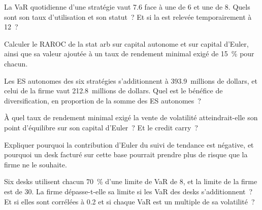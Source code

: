 \begin{exercise}[$\star$]\label{exo:fm:limits-and-capital-allocation:1}
La VaR quotidienne d'une stratégie vaut 7.6 face à une  de 6 et une  de 8. Quels sont son taux d'utilisation et son statut~? Et si la
 est relevée temporairement à 12~?
\end{exercise}

\begin{exercise}[$\star$]\label{exo:fm:limits-and-capital-allocation:2}
Calculer le RAROC de la stat arb sur capital autonome et sur capital d'Euler, ainsi que sa valeur ajoutée à un taux de rendement minimal exigé de 15~\% pour chacun.
\end{exercise}

\begin{exercise}[$\star$]\label{exo:fm:limits-and-capital-allocation:3}
Les ES autonomes des six stratégies s'additionnent à 393.9~millions de dollars, et celui de la firme vaut 212.8~millions de dollars. Quel est le bénéfice de diversification, en proportion
de la somme des ES autonomes~?
\end{exercise}

\begin{exercise}[$\star\star$]\label{exo:fm:limits-and-capital-allocation:4}
À quel taux de rendement minimal exigé la vente de volatilité atteindrait-elle son point d'équilibre sur son capital d'Euler~? Et le credit carry~?
\end{exercise}

\begin{exercise}[$\star\star$]\label{exo:fm:limits-and-capital-allocation:5}
Expliquer pourquoi la contribution d'Euler du suivi de tendance est négative, et pourquoi un desk facturé sur cette base pourrait prendre plus de risque que la firme ne le souhaite.
\end{exercise}

\begin{exercise}[$\star\star$]\label{exo:fm:limits-and-capital-allocation:6}
Six desks utilisent chacun 70~\% d'une limite de VaR de 8, et la limite de la firme est de 30. La firme dépasse-t-elle sa limite si les VaR des desks s'additionnent~? Et si elles sont corrélées à
0.2 et si chaque VaR est un multiple de sa volatilité~?
\end{exercise}

